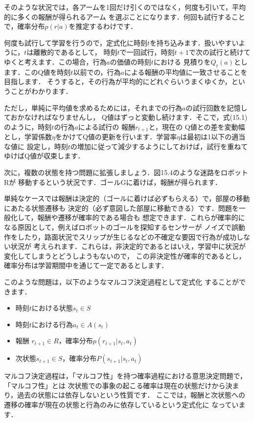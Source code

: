 そのような状況では，各アームを1回だけ引くのではなく，何度も引いて，平均的に多くの報酬が得られるアーム
を選ぶことになります．何回も試行することで，確率分布$p(r|a)$を推定するわけです．

何度も試行して学習を行うので，定式化に時刻$t$を持ち込みます．扱いやすいように，$t$は離散的であるとして，
時刻$t$で一回試行，時刻$t+1$で次の試行と続けてゆくと考えます．この場合，行為$a$の価値の時刻$t$における
見積りを$Q_t(a)$とします．このQ値を時刻$t$以前での，行為$a$による報酬の平均値に一致させることを目指します．
そうすると，その行為が平均的にどれぐらいうまくゆくか，ということがわかります．

ただし，単純に平均値を求めるためには，それまでの行為$a$の試行回数を記憶しておかなければなりませんし，
Q値はずっと変動し続けます．そこで，式(15.1)のように，時刻$t$の行為$a$による試行の
報酬$r_{t+1}$と，現在の
Q値との差を変動幅とし，学習係数$\eta$をかけてQ値の更新を行います．学習率$\eta$は最初は1以下の適当な値に
設定し，時刻$t$の増加に従って減少するようにしておけば，試行を重ねてゆけばQ値が収束します．


次に，複数の状態を持つ問題に拡張しましょう．図15.4のような迷路をロボットRが
移動するという状況です．ゴールGに着けば，報酬が得られます．

単純なケースでは報酬は決定的（ゴールに着けば必ずもらえる）で，部屋の移動にあたる状態遷移も
決定的（必ず意図した部屋に移動できる）です．問題を一般化して，報酬や遷移が確率的である場合も
想定できます．これらが確率的になる原因として，例えばロボットのゴールを探知するセンサーが
ノイズで誤動作をしたり，路面状況でスリップが生じるなどの不確定な要因で行為が成功しない状況が
考えられます．これらは，非決定的であるとはいえ，学習中に状況が変化してしまうとどうしようもないので，
この非決定性が確率的であるとし，確率分布は学習期間中を通じて一定であるとします．

このような問題は，以下のようなマルコフ決定過程として定式化
することができます．

\begin{itemize}
\item 時刻$t$における状態$s_t \in S$
\item 時刻$t$における行為$a_t \in A(s_t)$
\item 報酬 $r_{t+1} \in R$，確率分布$p(r_{t+1}|s_t, a_t)$
\item 次状態$s_{t+1} \in S$，確率分布$P(s_{t+1}|s_t, a_t)$
\end{itemize}

マルコフ決定過程は，「マルコフ性」を持つ確率過程における意思決定問題で，「マルコフ性」とは
次状態での事象の起こる確率は現在の状態だけから決まり，過去の状態には依存しないという性質です．
ここでは，報酬と次状態への遷移の確率が現在の状態と行為のみに依存しているという定式化に
なっています．

